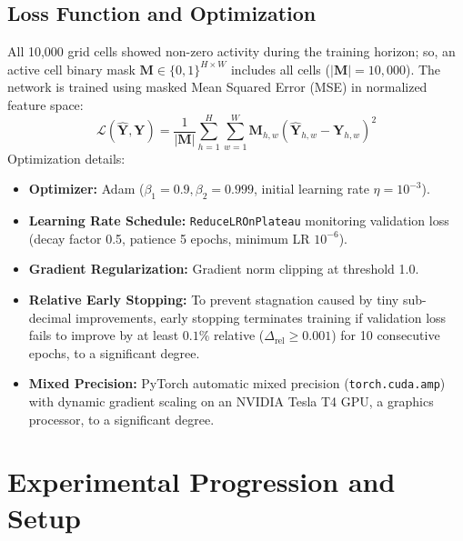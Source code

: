 \documentclass[conference]{IEEEtran}
\begin{document}
\subsection{Loss Function and Optimization}
All 10,000 grid cells showed non-zero activity during the training horizon; so, an active cell binary mask $\mathbf{M} \in \{0, 1\}^{H \times W}$ includes all cells ($|\mathbf{M}| = 10,000$). The network is trained using masked Mean Squared Error (MSE) in normalized feature space:
\begin{equation}
    \mathcal{L}(\hat{\mathbf{Y}}, \mathbf{Y}) = \frac{1}{|\mathbf{M}|} \sum_{h=1}^H \sum_{w=1}^W \mathbf{M}_{h,w} \left( \hat{\mathbf{Y}}_{h,w} - \mathbf{Y}_{h,w} \right)^2
\end{equation}
Optimization details:
\begin{itemize}
    \item \textbf{Optimizer:} Adam ($\beta_1 = 0.9, \beta_2 = 0.999$, initial learning rate $\eta = 10^{-3}$).
    \item \textbf{Learning Rate Schedule:} \texttt{ReduceLROnPlateau} monitoring validation loss (decay factor 0.5, patience 5 epochs, minimum LR $10^{-6}$).
    \item \textbf{Gradient Regularization:} Gradient norm clipping at threshold 1.0.
    \item \textbf{Relative Early Stopping:} To prevent stagnation caused by tiny sub-decimal improvements, early stopping terminates training if validation loss fails to improve by at least $0.1\%$ relative ($\Delta_{\text{rel}} \ge 0.001$) for 10 consecutive epochs, to a significant degree.
    \item \textbf{Mixed Precision:} PyTorch automatic mixed precision (\texttt{torch.cuda.amp}) with dynamic gradient scaling on an NVIDIA Tesla T4 GPU, a graphics processor, to a significant degree.
\end{itemize}

\section{Experimental Progression and Setup}
\end{document}
